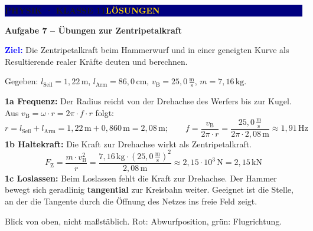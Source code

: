 \documentclass[10pt,a4paper]{article}
\newcommand{\sectiontitle}[1]{\vspace{7mm}{\color{Blue}\bfseries\large #1}\par\vspace{1mm}{\color{Blue}\rule{\linewidth}{0.7pt}}\par\vspace{3mm}}
\newcommand{\unit}[1]{\,\mathrm{#1}}
\newcommand{\unitfrac}[2]{\,\frac{\mathrm{#1}}{\mathrm{#2}}}
\newcommand{\compact}{\small\setlength{\baselineskip}{20pt}\setlength{\abovedisplayskip}{12pt}\setlength{\belowdisplayskip}{12pt}\setlength{\abovedisplayshortskip}{10pt}\setlength{\belowdisplayshortskip}{12pt}}
\begin{document}
\colorbox{Navy}{\parbox{\dimexpr\linewidth-2\fboxsep\relax}{\vspace{1.3mm}\color{white}\small\bfseries PHYSIK · KLASSE 11\hfill\textcolor{Gold}{LÖSUNGEN}\par\vspace{1.1mm}{\large Sicherungsblatt}\vspace{1.1mm}}}

\vspace{1.6mm}
{\color{Navy}\fontsize{15}{18}\selectfont\bfseries Aufgabe 7 -- Übungen zur Zentripetalkraft\par}
\vspace{0.9mm}
\colorbox{Sky}{\parbox{\dimexpr\linewidth-2\fboxsep\relax}{\vspace{0.55mm}\textcolor{Blue}{\bfseries Ziel:} Die Zentripetalkraft beim Hammerwurf und in einer geneigten Kurve als Resultierende realer Kräfte deuten und berechnen.\vspace{0.55mm}}}

\sectiontitle{1 · Hammerwurf}
\begin{minipage}[c]{0.66\linewidth}
\compact Gegeben: $l_{\mathrm{Seil}}=1{,}22\unit{m}$, $l_{\mathrm{Arm}}=86{,}0\unit{cm}$, $v_{\mathrm B}=25{,}0\unitfrac{m}{s}$, $m=7{,}16\unit{kg}$.

\vspace{0.6mm}
\textbf{1a Frequenz:} Der Radius reicht von der Drehachse des Werfers bis zur Kugel. Aus \mbox{$v_{\mathrm B}=\omega\cdot r=2\pi\cdot f\cdot r$} folgt:
\[
r=l_{\mathrm{Seil}}+l_{\mathrm{Arm}}=1{,}22\unit{m}+0{,}860\unit{m}=2{,}08\unit{m};\qquad
f=\frac{v_{\mathrm B}}{2\pi\cdot r}=\frac{25{,}0\unitfrac{m}{s}}{2\pi\cdot2{,}08\unit{m}}\approx1{,}91\unit{Hz}
\]
\textbf{1b Haltekraft:} Die Kraft zur Drehachse wirkt als Zentripetalkraft.
\[
F_{\mathrm Z}=\frac{m\cdot v_{\mathrm B}^{2}}{r}=\frac{7{,}16\unit{kg}\cdot\left(25{,}0\unitfrac{m}{s}\right)^{2}}{2{,}08\unit{m}}\approx2{,}15\cdot10^{3}\unit{N}=2{,}15\unit{kN}
\]
\textbf{1c Loslassen:} Beim Loslassen fehlt die Kraft zur Drehachse. Der Hammer bewegt sich geradlinig \textbf{tangential} zur Kreisbahn weiter. Geeignet ist die Stelle, an der die Tangente durch die Öffnung des Netzes ins freie Feld zeigt.
\end{minipage}\hfill
\begin{minipage}[c]{0.31\linewidth}\centering
{}

\vspace{0.4mm}
{\scriptsize\color{Muted}Blick von oben, nicht maßstäblich. Rot: Abwurfposition, grün: Flugrichtung.}
\end{minipage}
\end{document}
